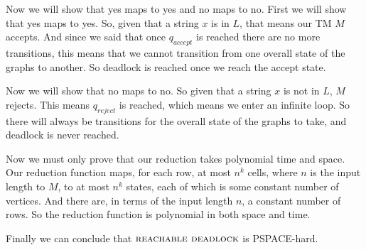 \documentclass{article}
\begin{document}
\begin{description}
        Now we will show that yes maps to yes and no maps to no. First we will
        show that yes maps to yes. So, given that a string $x$ is in $L$, that means
        our TM $M$ accepts. And since we said that once $q_{accept}$ is reached
        there are no more transitions, this means that we cannot transition
        from one overall state of the graphs to another. So deadlock is reached
        once we reach the accept state.

        Now we will show that no maps to no. So given that a string $x$ is not
        in $L$,
        $M$ rejects. This means $q_{reject}$ is reached, which means we enter
        an infinite loop. So there will always be transitions for the overall
        state of the graphs to take, and deadlock is never reached.

        Now we must only prove that our reduction takes polynomial time and
        space. Our reduction function maps, for each row,
        at most $n^{k}$ cells, where $n$ is
        the input length to $M$, to at most $n^{k}$ states, each of which is
        some constant number of vertices. And there are, in terms of the
        input length $n$, a constant number of rows. So the reduction function
        is polynomial in both space and time.

        Finally we can conclude that $\mbox{\sc reachable deadlock}$ is
        PSPACE-hard.


\end{description}

\newpage

\end{document}
